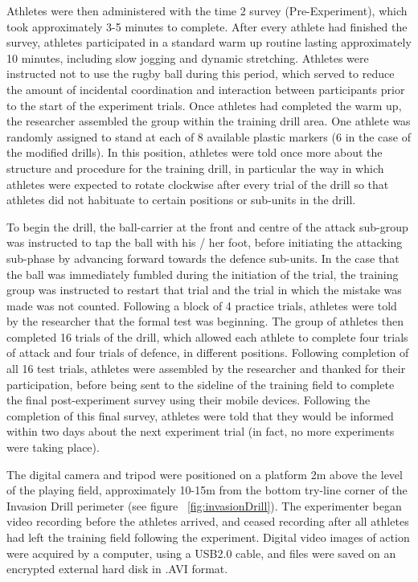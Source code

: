 Athletes were then administered with the time 2 survey (Pre-Experiment), which took approximately 3-5 minutes to complete.  After every athlete had finished the survey, athletes participated in a standard warm up routine lasting approximately 10 minutes, including slow jogging and dynamic stretching.  Athletes were instructed not to use the rugby ball during this period, which served to reduce the amount of incidental coordination and interaction between participants prior to the start of the experiment trials.  Once athletes had completed the warm up, the researcher assembled the group within the training drill area.  One athlete was randomly assigned to stand at each of 8 available plastic markers (6 in the case of the modified drills).  In this position, athletes were told once more about the structure and procedure for the training drill, in particular the way in which athletes were expected to rotate clockwise after every trial of the drill so that athletes did not habituate to certain positions or sub-units in the drill.

To begin the drill, the ball-carrier at the front and centre of the attack sub-group was instructed to tap the ball with his / her foot, before initiating the attacking sub-phase by advancing forward towards the defence sub-units.  In the case that the ball was immediately fumbled during the initiation of the trial, the training group was instructed to restart that trial and the trial in which the mistake was made was not counted.  Following a block of 4 practice trials, athletes were told by the researcher that the formal test was beginning.  The group of athletes then completed 16 trials of the drill, which allowed each athlete to complete four trials of attack and four trials of defence, in different positions.  Following completion of all 16 test trials, athletes were assembled by the researcher and thanked for their participation, before being sent to the sideline of the training field to complete the final post-experiment survey using their mobile devices.  Following the completion of this final survey, athletes were told that they would be informed within two days about the next experiment trial (in fact, no more experiments were taking place).

The digital camera and tripod were positioned on a platform 2m above the level of the playing field, approximately 10-15m from the bottom try-line corner of the Invasion Drill perimeter (see figure ~\ref{fig:invasionDrill}).  The experimenter began video recording before the athletes arrived, and ceased recording after all athletes had left the training field following the experiment.  Digital video images of action were acquired by a computer, using a USB2.0 cable, and files were saved on an encrypted external hard disk in .AVI format.

